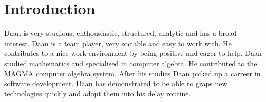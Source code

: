 \section*{Introduction}

Daan is very studious, enthousiastic, structured, analytic and has a
broad interest. Daan is a team player, very sociable and easy to work
with. He contributes to a nice work environment by being positive and
eager to help. Daan studied mathematics and specialised in computer
algebra. He contributed to the MAGMA computer algebra system.
After his studies Daan picked up a carreer in software
development. Daan has demonstrated to be able to graps new
technologies quickly and adopt them into his delay routine.
